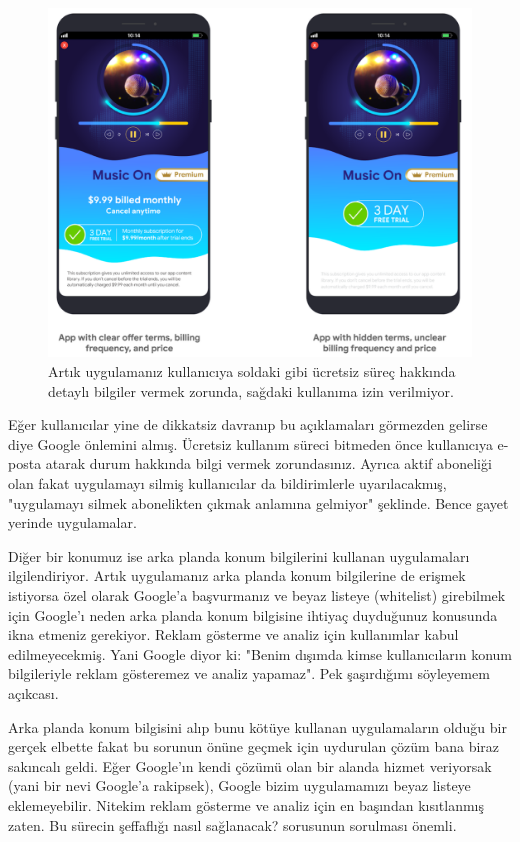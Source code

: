 \documentclass[11pt]{article}
\begin{document}
\begin{figure}[htbp]
\centering
\includegraphics[width=.9\linewidth]{gorseller/play-store-policy.png}
\caption{Artık uygulamanız kullanıcıya soldaki gibi ücretsiz süreç hakkında detaylı bilgiler vermek zorunda, sağdaki kullanıma izin verilmiyor.}
\end{figure}

Eğer kullanıcılar yine de dikkatsiz davranıp bu açıklamaları görmezden gelirse
diye Google önlemini almış. Ücretsiz kullanım süreci bitmeden önce kullanıcıya
e-posta atarak durum hakkında bilgi vermek zorundasınız. Ayrıca aktif
aboneliği olan fakat uygulamayı silmiş kullanıcılar da bildirimlerle
uyarılacakmış, "uygulamayı silmek abonelikten çıkmak anlamına gelmiyor"
şeklinde. Bence gayet yerinde uygulamalar.

Diğer bir konumuz ise arka planda konum bilgilerini kullanan uygulamaları
ilgilendiriyor. Artık uygulamanız arka planda konum bilgilerine de erişmek
istiyorsa özel olarak Google'a başvurmanız ve beyaz listeye (whitelist)
girebilmek için Google'ı neden arka planda konum bilgisine ihtiyaç duyduğunuz
konusunda ikna etmeniz gerekiyor. Reklam gösterme ve analiz için kullanımlar
kabul edilmeyecekmiş. Yani Google diyor ki: "Benim dışımda kimse
kullanıcıların konum bilgileriyle reklam gösteremez ve analiz yapamaz". Pek
şaşırdığımı söyleyemem açıkcası.

Arka planda konum bilgisini alıp bunu kötüye kullanan uygulamaların olduğu bir
gerçek elbette fakat bu sorunun önüne geçmek için uydurulan çözüm bana biraz
sakıncalı geldi. Eğer Google'ın kendi çözümü olan bir alanda hizmet veriyorsak
(yani bir nevi Google'a rakipsek), Google bizim uygulamamızı beyaz listeye
eklemeyebilir. Nitekim reklam gösterme ve analiz için en başından kısıtlanmış
zaten. Bu sürecin şeffaflığı nasıl sağlanacak? sorusunun sorulması önemli.
\end{document}
